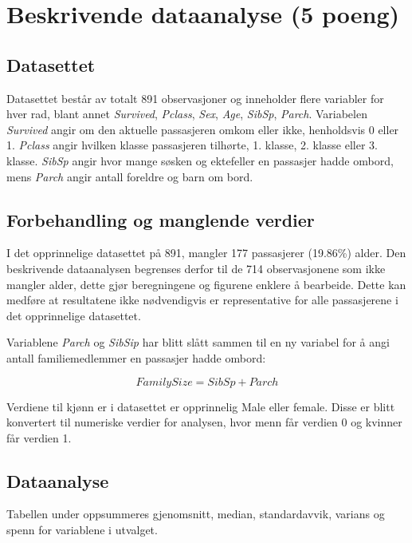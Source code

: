 \section{Beskrivende dataanalyse (5 poeng)}\label{beskrivende-dataanalyse-5-poeng}
\subsection{Datasettet}
Datasettet består av totalt 891 observasjoner og inneholder flere variabler for hver rad, blant annet \textit{Survived}, \textit{Pclass}, \textit{Sex}, \textit{Age}, \textit{SibSp}, \textit{Parch}. Variabelen \textit{Survived} angir om den aktuelle passasjeren omkom eller ikke, henholdsvis 0 eller 1. \textit{Pclass} angir hvilken klasse passasjeren tilhørte, 1. klasse, 2. klasse eller 3. klasse. 
\textit{SibSp} angir hvor mange søsken og ektefeller en passasjer hadde ombord, mens \textit{Parch} angir antall foreldre og barn om bord. 

\subsection{Forbehandling og manglende verdier}

I det opprinnelige datasettet på 891, mangler 177 passasjerer (19.86\%) alder. Den beskrivende dataanalysen begrenses derfor til de 714 observasjonene som ikke mangler alder, dette gjør beregningene og figurene enklere å bearbeide. Dette kan medføre at resultatene ikke nødvendigvis er representative for alle passasjerene i det opprinnelige datasettet.

Variablene \textit{Parch} og \textit{SibSip} har blitt slått sammen til en ny variabel for å angi antall familiemedlemmer en passasjer hadde ombord:

$$FamilySize = SibSp + Parch$$


Verdiene til kjønn er i datasettet er opprinnelig Male eller female. Disse er blitt konvertert til numeriske verdier for analysen, hvor menn får verdien 0 og kvinner får verdien 1. %

\subsection{Dataanalyse}

Tabellen under oppsummeres gjenomsnitt, median, standardavvik, varians og spenn for variablene i utvalget.

